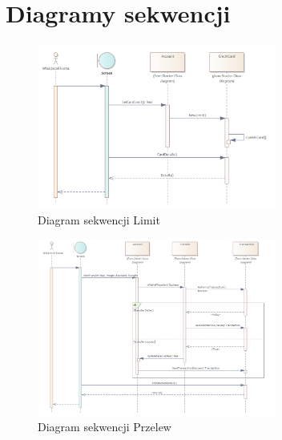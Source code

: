 \section{Diagramy sekwencji}
\begin{figure}[H]
	\centering
	\includegraphics[width=0.7\textwidth]{images/Limit.png}
	\caption{Diagram sekwencji Limit}
	\label{fig:Seq1}
\end{figure}
\begin{figure}[H]
	\centering
	\includegraphics[width=0.7\textwidth]{images/Przelew.png}
	\caption{Diagram sekwencji Przelew}
	\label{fig:Seq2}
\end{figure}
